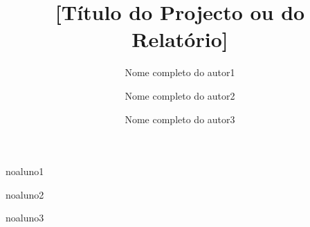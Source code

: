 \def\thetitle{%
 [Título do Projecto ou do Relatório]
}
\def\theauthor{%
 [Acrónimo dos alunos]
}

\title{ \thetitle }

\author[m]{Nome completo do autor1}{noaluno1}
\author[m]{Nome completo do autor2}{noaluno2}
\author[m]{Nome completo do autor3}{noaluno3}



